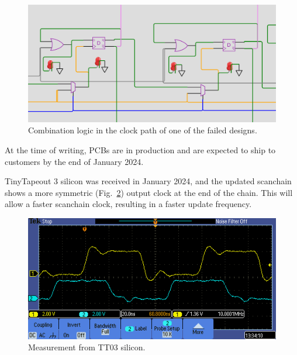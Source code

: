 \begin{figure}[!t]
\centering
\includegraphics[width=\columnwidth]{./Figs/wokwi mux clock logic.png}
\caption{Combination logic in the clock path of one of the failed designs.}
\label{fig:failed_design_comb_logic}
\end{figure}

At the time of writing, PCBs are in production and are expected to ship to customers by the end of January 2024.

TinyTapeout 3 silicon was received in January 2024, and the updated scanchain shows a more symmetric (Fig.~\ref{fig:TT03_silicon_measurement}) output clock at the end of the chain. This will allow a faster scanchain clock, resulting in a faster update frequency.

\begin{figure}[!t]
\centering
\includegraphics[width=\columnwidth]{./Figs/tt03_clock_out.png}
\caption{Measurement from TT03 silicon.}
\label{fig:TT03_silicon_measurement}
\end{figure}

